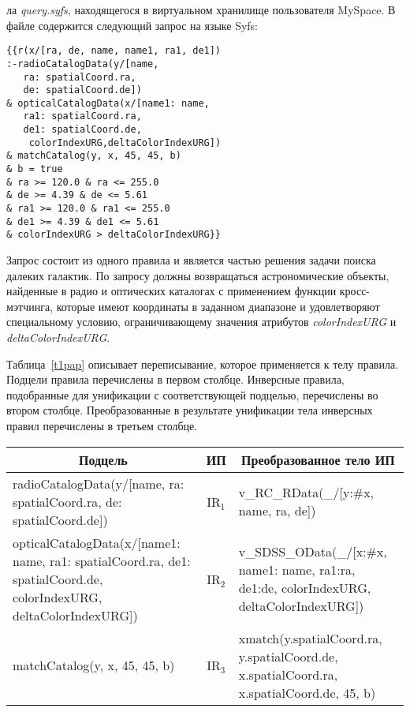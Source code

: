 \begin{multicols}{2}
\noindent
ла \textit{query.syfs}, находящегося в виртуальном хранилище
пользователя MySpace. В файле содержится следующий запрос на языке Syfs:
\begin{verbatim}
{{r(x/[ra, de, name, name1, ra1, de1])
:-radioCatalogData(y/[name,
   ra: spatialCoord.ra,
   de: spatialCoord.de])
& opticalCatalogData(x/[name1: name,
   ra1: spatialCoord.ra,
   de1: spatialCoord.de,
    colorIndexURG,deltaColorIndexURG])
& matchCatalog(y, x, 45, 45, b)
& b = true
& ra >= 120.0 & ra <= 255.0
& de >= 4.39 & de <= 5.61
& ra1 >= 120.0 & ra1 <= 255.0
& de1 >= 4.39 & de1 <= 5.61
& colorIndexURG > deltaColorIndexURG}}
\end{verbatim}

     Запрос состоит из одного правила и является частью решения задачи поиска далеких
галактик. По запросу должны возвращаться астрономические объекты, найденные в радио
и оптических каталогах с применением функции кросс-мэтчинга, которые имеют
координаты в заданном диапазоне и удовлетворяют специальному условию,
ограничивающему значения атрибутов \textit{colorIndexURG} и
\textit{deltaColorIndexURG}.

     Таблица~\ref{t1pap} описывает переписывание, которое применяется к телу правила.
Подцели правила перечислены в первом столбце. Инверсные правила, подобранные для
унификации с соответствующей подцелью, перечислены во втором столбце.
Преобразованные в результате унификации тела инверсных правил перечислены в
третьем столбце.

     \begin{table*}\small
     \begin{center}
     \vspace*{2ex}

     \begin{tabular}{|p{200pt}|c|p{180pt}|}
     \hline
\multicolumn{1}{|c|}{Подцель}&ИП&\multicolumn{1}{c|}{Преобразованное тело ИП}\\
\hline
{\sf radioCatalogData(y/[name, ra: spatialCoord.ra},\newline
{\sf de: spatialCoord.de])}&IR$_1$&{\sf v\_RC\_RData(\_/[y:\#x,
name, ra, de])}\\
\hline
{\sf opticalCatalogData(x/[name1: name},\newline
{\sf ra1: spatialCoord.ra},\newline
{\sf de1: spatialCoord.de, colorIndexURG},\newline
{\sf deltaColorIndexURG])}&IR$_2$&
{\sf v\_SDSS\_OData(\_/[x:\#x, name1: name, ra1:ra, de1:de, colorIndexURG,
deltaColorIndexURG])}\\
\hline
{\sf matchCatalog(y, x, 45, 45, b) }&IR$_3$&
{\sf xmatch(y.spatialCoord.ra, y.spatialCoord.de},\newline
{\sf x.spatialCoord.ra, x.spatialCoord.de, 45, b)}\\
\hline
\end{tabular}
\end{center}
\end{table*}


\end{multicols}
